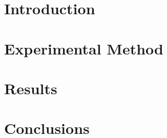 \documentclass[12pt]{titlepage}
\begin{document}
\tableofcontents

\chapter{Introduction} 
 

\chapter{Experimental Method} 


\chapter{Results}


\chapter{Conclusions}


\appendix
\appendixpage
{}


\printbibliography[heading = bibintoc]
\end{document}
